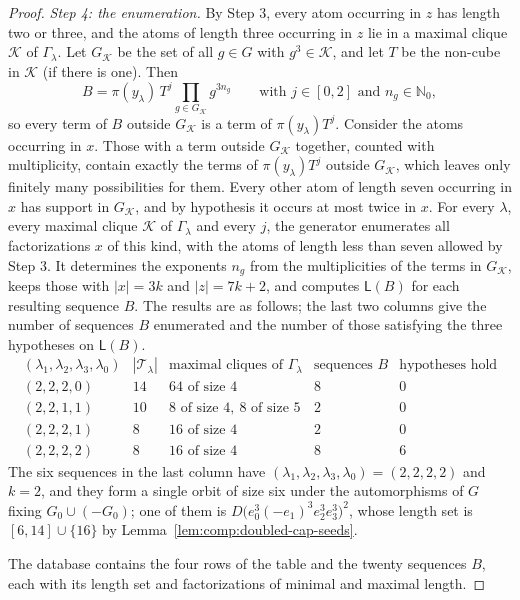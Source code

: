 \documentclass[a4paper, 10pt]{amsart}
\theoremstyle{plain}
\theoremstyle{definition}
\theoremstyle{definition}
\newcommand{\N}{\mathbb N}
\newcommand{\code}[1]{\texttt{\detokenize{#1}}}
\numberwithin{equation}{section}
\begin{document}
\begin{proof}
\smallskip
\noindent
\emph{Step 4: the enumeration.}  By Step 3, every atom occurring in $z$ has length
two or three, and the atoms of length three occurring in $z$ lie in a maximal clique
$\mathcal K$ of $\Gamma_\lambda$.  Let $G_{\mathcal K}$ be the set of all
$g \in G$ with $g^3 \in \mathcal K$, and let $T$ be the non-cube in
$\mathcal K$ (if there is one).  Then
\[
 B = \pi(y_\lambda)\, T^j \prod_{g \in G_{\mathcal K}} g^{3n_g}
 \qquad \text{with } j \in [0,2] \text{ and } n_g \in \N_0 ,
\]
so every term of $B$ outside $G_{\mathcal K}$ is a term of
$\pi(y_\lambda)T^j$.  Consider the atoms occurring in $x$.  Those with a term outside
$G_{\mathcal K}$ together, counted with multiplicity, contain exactly the
terms of $\pi(y_\lambda)T^j$ outside $G_{\mathcal K}$, which leaves only
finitely many possibilities for them.  Every other atom of length seven
occurring in $x$ has support in $G_{\mathcal K}$, and by hypothesis it occurs at most twice in $x$.  For
every $\lambda$, every maximal clique $\mathcal K$ of $\Gamma_\lambda$ and
every $j$, the generator enumerates all factorizations $x$ of this kind,
with the atoms of length less than seven allowed by Step 3.  It
determines the exponents $n_g$ from the multiplicities of the terms in
$G_{\mathcal K}$, keeps those with $|x| = 3k$ and $|z| = 7k+2$, and computes
$\mathsf L (B)$ for each resulting sequence $B$.
The results are as follows; the last two columns give the number of
sequences $B$ enumerated and the number of those satisfying the three
hypotheses on $\mathsf L (B)$.
\[
\begin{array}{c|c|c|c|c}
(\lambda_1,\lambda_2,\lambda_3,\lambda_0) & |\mathcal T_\lambda| &
 \text{maximal cliques of } \Gamma_\lambda & \text{sequences } B & \text{hypotheses hold}\\ \hline
(2,2,2,0)&14&64\text{ of size }4&8&0\\
(2,2,1,1)&10&8\text{ of size }4,\
             8\text{ of size }5&2&0\\
(2,2,2,1)&8&16\text{ of size }4&2&0\\
(2,2,2,2)&8&16\text{ of size }4&8&6
\end{array}
\]
The six sequences in the last column have
$(\lambda_1,\lambda_2,\lambda_3,\lambda_0)=(2,2,2,2)$ and $k=2$, and they
form a single orbit of size six under the automorphisms of $G$ fixing
$G_0 \cup (-G_0)$; one of them is $D\bigl(e_0^3(-e_1)^3e_2^3e_3^3\bigr)^2$,
whose length set is $[6,14]\cup\{16\}$ by
Lemma~\ref{lem:comp:doubled-cap-seeds}.

The database \code{doubled-cap-cubes.jsonl} contains the four rows of
the table and the twenty sequences $B$, each with its length set and
factorizations of minimal and maximal length.
\end{proof}
\end{document}
